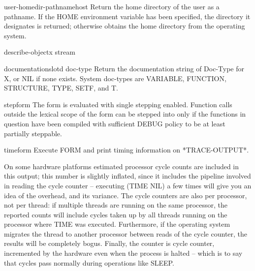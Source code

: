 \begin{function}{user-homedir-pathname}{\op host}{}{}
  Return the home directory of the user as a pathname. If the HOME
environment variable has been specified, the directory it designates
is returned; otherwise obtains the home directory from the operating
system.
\end{function}

\begin{generic}{describe-object}{x stream}{}{}
  
\end{generic}

\begin{generic}{documentation}{slotd doc-type}{}{}
  Return the documentation string of Doc-Type for X, or NIL if
  none exists. System doc-types are VARIABLE, FUNCTION, STRUCTURE, TYPE,
  SETF, and T.
\end{generic}

\begin{macro}{step}{form}{}{}
  The form is evaluated with single stepping enabled. Function calls
outside the lexical scope of the form can be stepped into only if the
functions in question have been compiled with sufficient DEBUG policy
to be at least partially steppable.
\end{macro}

\begin{macro}{time}{form}{}{}
  Execute FORM and print timing information on *TRACE-OUTPUT*.

On some hardware platforms estimated processor cycle counts are
included in this output; this number is slightly inflated, since it
includes the pipeline involved in reading the cycle counter --
executing (TIME NIL) a few times will give you an idea of the
overhead, and its variance. The cycle counters are also per processor,
not per thread: if multiple threads are running on the same processor,
the reported counts will include cycles taken up by all threads
running on the processor where TIME was executed. Furthermore, if the
operating system migrates the thread to another processor between
reads of the cycle counter, the results will be completely bogus.
Finally, the counter is cycle counter, incremented by the hardware
even when the process is halted -- which is to say that cycles pass
normally during operations like SLEEP.
\end{macro}


